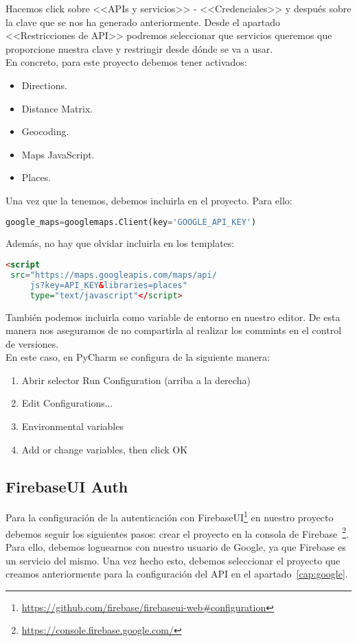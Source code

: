 Hacemos click sobre <<APIs y servicios>> - <<Credenciales>> y después sobre la clave que se nos ha generado anteriormente. Desde el apartado <<Restricciones de API>> podremos seleccionar que servicios queremos que proporcione nuestra clave y restringir desde dónde se va a usar.\\
En concreto, para este proyecto debemos tener activados:
\begin{itemize}
	\item Directions.
	\item Distance Matrix.
	\item Geocoding.
	\item Maps JavaScript.
	\item Places.
\end{itemize}


Una vez que la tenemos, debemos incluirla en el proyecto. Para ello:
\renewcommand{\lstlistingname}{Google Key}%
\renewcommand{\lstlistlistingname}{List of \lstlistingname s}
\begin{lstlisting}[language=python,caption={Añadir \texttt{API\_KEY}}]
google_maps=googlemaps.Client(key='GOOGLE_API_KEY')
\end{lstlisting}

Además, no hay que olvidar incluirla en los templates:
\begin{lstlisting}[language=html,caption={Añadir \texttt{API\_KEY} a los templates}]
<script
 src="https://maps.googleapis.com/maps/api/
	 js?key=API_KEY&libraries=places" 
	 type="text/javascript"</script>
\end{lstlisting}

También podemos incluirla como variable de entorno en nuestro editor. De esta manera nos aseguramos de no compartirla al realizar los commints en el control de versiones.
\\
En este caso, en PyCharm se configura de la siguiente manera:
\begin{enumerate}
\item Abrir selector Run Configuration (arriba a la derecha)
\item Edit Configurations...
\item Environmental variables
\item Add or change variables, then click OK 
\end{enumerate}


\subsection{FirebaseUI Auth}
Para la configuración de la autenticación con FirebaseUI\footnote{\url{https://github.com/firebase/firebaseui-web\#configuration}} en nuestro proyecto debemos seguir los siguientes pasos:
crear el proyecto en la consola de Firebase~\footnote{\url{https://console.firebase.google.com/}}. Para ello, debemos loguearnos con nuestro usuario de Google, ya que Firebase es un servicio del mismo. Una vez hecho esto, debemos seleccionar el proyecto que creamos anteriormente para la configuración del API en el apartado~\ref{cap:google}.

